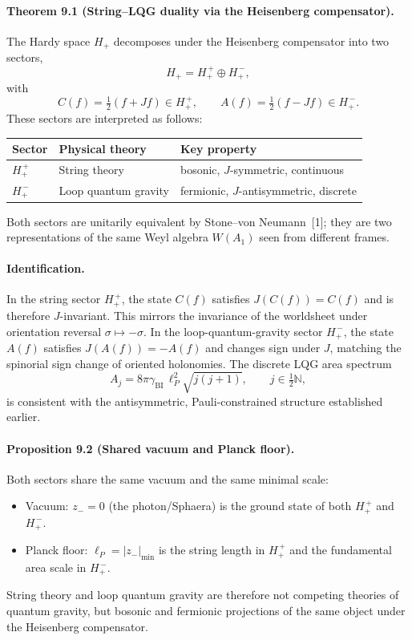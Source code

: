 \documentclass[12pt,a4paper]{article}
\begin{document}
\paragraph*{Theorem 9.1 (String--LQG duality via the Heisenberg compensator).}
The Hardy space $H_+$ decomposes under the Heisenberg compensator into two sectors,
\[
H_+ = H_+^{\,+} \oplus H_+^{\,-},
\]
with
\[
C(f)=\tfrac12(f+Jf) \in H_+^{\,+}, \qquad A(f)=\tfrac12(f-Jf) \in H_+^{\,-}.
\]
These sectors are interpreted as follows:
\begin{center}
\begin{tabular}{lll}
\toprule
Sector & Physical theory & Key property \\
\midrule
$H_+^{\,+}$ & String theory & bosonic, $J$-symmetric, continuous \\
$H_+^{\,-}$ & Loop quantum gravity & fermionic, $J$-antisymmetric, discrete \\
\bottomrule
\end{tabular}
\end{center}
Both sectors are unitarily equivalent by Stone--von Neumann~[1]; they are two representations of the same Weyl algebra $W(A_1)$ seen from different frames.

\paragraph*{Identification.}
In the string sector $H_+^{\,+}$, the state $C(f)$ satisfies $J(C(f))=C(f)$ and is therefore $J$-invariant. This mirrors the invariance of the worldsheet under orientation reversal $\sigma \mapsto -\sigma$. In the loop-quantum-gravity sector $H_+^{\,-}$, the state $A(f)$ satisfies $J(A(f))=-A(f)$ and changes sign under $J$, matching the spinorial sign change of oriented holonomies. The discrete LQG area spectrum
\[
A_j = 8\pi \gamma_{\mathrm{BI}} \, \ell_P^2 \sqrt{j(j+1)}, \qquad j \in \tfrac12\mathbb{N},
\]
is consistent with the antisymmetric, Pauli-constrained structure established earlier.

\paragraph*{Proposition 9.2 (Shared vacuum and Planck floor).}
Both sectors share the same vacuum and the same minimal scale:
\begin{itemize}
 \item Vacuum: $z_-=0$ (the photon/Sphaera) is the ground state of both $H_+^{\,+}$ and $H_+^{\,-}$.
 \item Planck floor: $\ell_P = |z_-|_{\min}$ is the string length in $H_+^{\,+}$ and the fundamental area scale in $H_+^{\,-}$.
\end{itemize}
String theory and loop quantum gravity are therefore not competing theories of quantum gravity, but bosonic and fermionic projections of the same object under the Heisenberg compensator.
\end{document}
